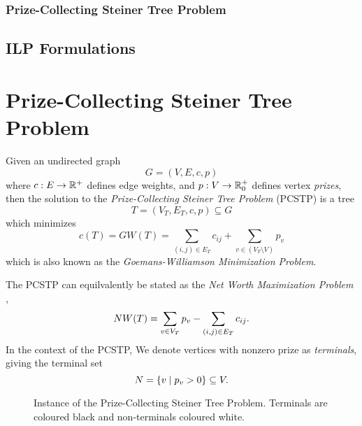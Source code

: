 \subsubsection{Prize-Collecting Steiner Tree Problem}

\subsection{ILP Formulations}
\section{Prize-Collecting Steiner Tree Problem}
Given an undirected graph
$$G = (V, E, c, p)$$
where $c: E \to \mathbb{R}^+$ defines edge weights,
and $p: V \to \mathbb{R}_0^+$ defines vertex \textit{prizes}, then the solution to the \textit{Prize-Collecting
  Steiner Tree Problem} (PCSTP) is a tree
$$T = (V_T, E_T, c, p) \subseteq G$$
which minimizes
$$c(T) = GW(T) = \sum_{(i,j) \in E_T} c_{ij} + \sum_{v\in (V_T \setminus V)} p_v$$
which is also known as the {\textit{Goemans-Williamson Minimization Problem}}.

The PCSTP can equilvalently be stated as the {\textit{Net Worth Maximization Problem}} \citep{Johnson:2000:PCS:338219.338637},
$$NW(T) = \sum_{v \in V_T} p_v - \sum_{(i,j) \in E_T} c_{ij} \mathnormal{.}$$
In the context of the PCSTP, We denote vertices with nonzero prize as \textit{terminals}, giving the terminal set
$$N = \{v \mid p_v > 0\} \subseteq V\mathnormal{.}$$

\begin{figure}[h]\centering
{}
\caption{Instance of the Prize-Collecting Steiner Tree Problem. Terminals are coloured black and non-terminals coloured white.}
\label{fig:pcstp:01}
\end{figure}

